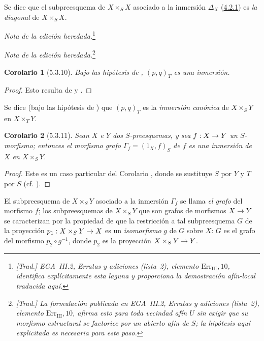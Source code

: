 \documentclass[oneside]{amsart}
\theoremstyle{ega-env-style}
\theoremstyle{ega-thm-env-style}
\newtheorem*{corollary}{Corolario}
\theoremstyle{ega-defn-env-style}
\renewcommand{\to}{\mathchoice{\longrightarrow}{\rightarrow}{\rightarrow}{\rightarrow}}
\newcommand{\oldpage}[2][]{{\marginnote{\normalfont{\textbf{#1}~|~#2}}}\ignorespaces}
\let\EGAOriginalLabel\label
\renewcommand{\label}[1]{\phantomsection\EGAOriginalLabel{#1}}
\begin{document}
Se dice que el subpreesquema de $X\times_S X$ asociado a la inmersión
$\Delta_X$ (\hyperref[I.4.2.1-fr]{4.2.1}) es \emph{la diagonal} de
$X\times_S X$.


\par\noindent\textit{Nota de la edición heredada.}\footnote{\emph{[Trad.] EGA~III.2, Erratas y adiciones (lista~2), elemento $\mathrm{Err}_{\mathrm{III}},10$, identifica explícitamente esta laguna y proporciona la demostración afín-local traducida aquí.}}\par
\par\noindent\textit{Nota de la edición heredada.}\footnote{\emph{[Trad.] La formulación publicada en EGA~III.2, Erratas y adiciones (lista~2), elemento $\mathrm{Err}_{\mathrm{III}},10$, afirma esto para toda vecindad afín $U$ sin exigir que su morfismo estructural se factorice por un abierto afín de $S$; la hipótesis aquí explicitada es necesaria para este paso.}}\par
\begin{corollary}[5.3.10]
\label{I.5.3.10}
Bajo las hipótesis de , $(p,q)_T$ es una inmersión.
\end{corollary}

\begin{proof}
Esto resulta de  y .
\end{proof}

Se dice (bajo las hipótesis de ) que $(p,q)_T$ es la \emph{inmersión canónica} de $X\times_S Y$ en $X\times_T Y$.

\begin{corollary}[5.3.11]
\label{I.5.3.11}
Sean $X$ e $Y$ dos $S$-preesquemas, y sea $f:X\to Y$ un $S$-morfismo;
entonces el morfismo grafo $\Gamma_f=(1_X,f)_S$ de $f$  es una inmersión de $X$ en $X\times_S Y$.
\end{corollary}

\begin{proof}
Este es un caso particular del Corolario , donde se sustituye $S$ por $Y$ y $T$ por $S$ (cf. ).
\end{proof}

\oldpage[I]{134}
El subpreesquema de $X\times_S Y$ asociado a la inmersión $\Gamma_f$  se llama \emph{el grafo} del morfismo $f$;
los subpreesquemas de $X\times_S Y$ que son grafos de morfismos $X\to Y$ se caracterizan por la propiedad de que la restricción a tal subpreesquema $G$ de la proyección $p_1:X\times_S Y\to X$ es un \emph{isomorfismo} $g$ de $G$ sobre $X$:
$G$ es el grafo del morfismo $p_2\circ g^{-1}$, donde $p_2$ es la proyección $X\times_S Y\to Y$.
\end{document}

